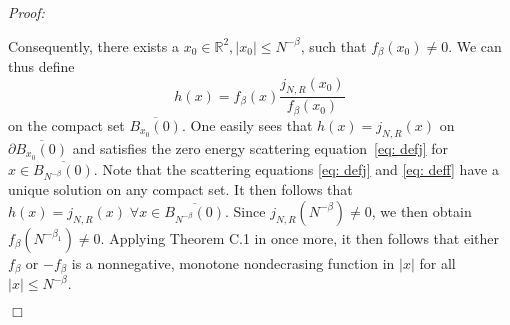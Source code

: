 \documentclass[11pt, english, american]{article}
\newenvironment{proof}{\emph{Proof:}}{\begin{flushright} $ \Box $ \end{flushright}}
\begin{document}
\begin{proof}
\begin{enumerate}
Consequently, there exists a $x_0 \in \mathbb{R}^2, |x_0| \leq N^{-\beta}$, such that
$f_{\beta}(x_0) \neq 0$.
We can thus define 
\begin{equation*}
h(x) = f_{\beta}(x)\frac{j_{N,R}(x_0)}{f_{\beta}(x_0)}
\end{equation*}
on the compact set $\overline{B_{x_0}(0)}$.
One easily sees  that $h(x)= j_{N,R}(x)$ on $\partial \overline{B_{x_0}(0)}$ and satisfies the zero energy scattering equation~\eqref{eq: defj} for $ x \in \overline{B_{N^{-\beta}}(0)}$.
Note that the scattering equations \eqref{eq: defj} and \eqref{eq: deff} have a unique solution on any compact set.
It then follows that 
$h(x) = j_{N, R}(x) \; \forall x \in \overline{B_{N^{-\beta}}(0)}$.
Since $j_{N, R} (N^{-\beta}) \neq 0$, we then obtain
$f_{\beta}(N^{-\beta_1}) \neq 0$.
Applying Theorem C.1 in \cite{lssy} once more, it then follows that either $f_\beta$ or $-f_\beta$ is a nonnegative, monotone nondecrasing function in $|x|$
 for all $|x| \leq N^{-\beta}$.


\end{enumerate}
\end{proof}
\end{document}
